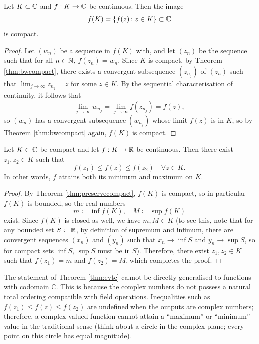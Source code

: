 \documentclass[../analysis1.tex]{subfiles}
\begin{document}
\begin{theorem}
\label{thm:preservecompact}
    \begin{shaded*}
    Let $K\subset \mathbb{C}$ and $f:K\to\mathbb{C}$ be continuous. Then the image
    \[f(K)=\{f(z):z\in K\}\subset\mathbb{C}\]
    is compact.
    \end{shaded*}
\end{theorem}
\begin{proof}
    Let $(w_n)$ be a sequence in $f(K)$ with, and let $(z_n)$ be the sequence such that for all $n\in\mathbb{N}$, $f(z_n)=w_n$. Since $K$ is compact, by Theorem \ref{thm:bwcompact}, there exists a convergent subsequence $(z_{n_j})$ of $(z_n)$ such that $\lim_{j\to\infty}z_{n_j}=z$ for some $z\in K$. By the sequential characterisation of continuity, it follows that
    \[\lim_{j\to\infty}w_{n_j}=\lim_{j\to\infty}f(z_{n_j})=f(z),\]
    so $(w_n)$ has a convergent subsequence $(w_{n_j})$ whose limit $f(z)$ is in $K$, so by Theorem \ref{thm:bwcompact} again, $f(K)$ is compact.\qedhere
\end{proof}

\begin{theorem}
\label{thm:evtc}
    \begin{shaded*}
        Let $K\subset\mathbb{C}$ be compact and let $f:K\to\mathbb{R}$ be continuous. Then there exist $z_1,z_2\in K$ such that
        \[f(z_1)\le f(z)\le f(z_2)\quad\forall z\in K.\]
        In other words, $f$ attains both its minimum and maximum on $K$.
    \end{shaded*}
\end{theorem}
\begin{proof}
    By Theorem \ref{thm:preservecompact}, $f(K)$ is compact, so in particular $f(K)$ is bounded, so the real numbers
    \[m\coloneqq \inf f(K),\quad M\coloneqq \sup f(K)\]
    exist. Since $f(K)$ is closed as well, we have $m,M\in K$ (to see this, note that for any bounded set $S\subset \mathbb{R}$, by definition of supremum and infimum, there are convergent sequences $(x_n)$ and $(y_n)$ such that $x_n\to \inf S$ and $y_n\to \sup S$, so for compact sets $\inf S$, $\sup S$ must be in $S$).
    Therefore, there exist $z_1,z_2\in K$ such that $f(z_1)=m$ and $f(z_2)=M$, which completes the proof.\qedhere
\end{proof}
The statement of Theorem \ref{thm:evtc} cannot be directly generalised to functions with codomain $\mathbb{C}$. This is because the complex numbers do not possess a natural total ordering compatible with field operations. Inequalities such as $f(z_1) \le f(z) \le f(z_2)$ are undefined when the outputs are complex numbers; therefore, a complex-valued function cannot attain a ``maximum'' or ``minimum'' value in the traditional sense (think about a circle in the complex plane; every point on this circle has equal magnitude).
\end{document}
